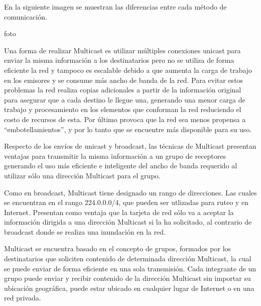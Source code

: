 \documentclass[12pt,a4paper,oneside]{book}
\begin{document}
\vspace{0.5cm}

En la siguiente imagen se muestran las diferencias entre cada método de comunicación.

foto

\vspace{0.5cm}

Una forma de realizar Multicast es utilizar múltiples conexiones unicast para enviar la misma información a los destinatarios pero no se utiliza de forma eficiente la red y tampoco es escalable debido a que aumenta la carga de trabajo en los emisores y se consume más ancho de banda de la red. Para evitar estos problemas la red realiza copias adicionales a partir de la información original para asegurar que a cada destino le llegue una, generando una menor carga de trabajo y procesamiento en los elementos que conforman la red reduciendo el costo de recursos de esta. Por último provoca que la red sea menos propensa a “embotellamientos”, y por lo tanto que se encuentre más disponible para su uso. 

\vspace{0.5cm}

Respecto de los envíos de unicast y broadcast, las técnicas de Multicast presentan ventajas para transmitir la misma información a un grupo de receptores generando el uso más eficiente e inteligente del ancho de banda requerido al utilizar sólo una dirección Multicast para el grupo. 

\vspace{0.5cm}

Como en broadcast, Multicast tiene designado un rango de direcciones. Las cuales se encuentran en el rango 224.0.0.0/4, que pueden ser utlizadas para ruteo y en Internet. Presentan como ventaja que la tarjeta de red sólo va a aceptar la información dirigida a una dirección Multicast si la ha solicitado, al contrario de broadcast donde se realiza una inundación en la red.

\vspace{0.5cm}

Multicast se encuentra basado en el concepto de grupos, formados por los destinatarios que soliciten contenido de determinada dirección Multicast, la cual se puede enviar de forma eficiente en una sola transmisión. Cada integrante de un grupo puede enviar y recibir contenido de la dirección Multicast sin importar su ubicación geográfica, puede estar ubicado en cualquier lugar de Internet o en una red privada.

\vspace{0.5cm}
\end{document}
